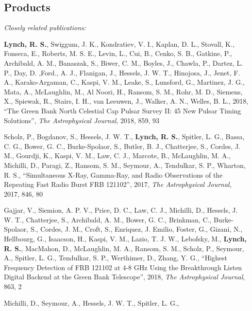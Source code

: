 \documentclass[10pt]{myNSF}
\begin{document}
\subsection*{\normalsize Products}

\textit{Closely related publications:}
\vspace{-1em}
\begin{itemize*}
\item{\textbf{Lynch, R. S.}, Swiggum, J. K., Kondratiev, V. I.,
  Kaplan, D. L., Stovall, K., Fonseca, E., Roberts, M. S. E., Levin,
  L., Cui, B., Cenko, S. B., Gatkine, P., Archibald, A. M., Banaszak,
  S., Biwer, C. M., Boyles, J., Chawla, P., Dartez, L. P., Day,
  D. ,Ford., A. J., Flanigan, J., Hessels, J. W. T., Hinojosa, J.,
  Jenet, F. A., Karako-Argaman, C., Kaspi, V. M., Leake, S., Lunsford,
  G., Martinez, J. G., Mata, A., McLaughlin, M., Al Noori, H., Ransom,
  S. M., Rohr, M. D., Siemens, X., Spiewak, R., Stairs, I. H., van
  Leeuwen, J., Walker, A. N., Welles, B. L., 2018, ``The Green Bank
  North Celestial Cap Pulsar Survey II: 45 New Pulsar Timing
  Solutions'', \emph{The Astrophysical Journal}, 2018, 859, 93}
\item{Scholz, P., Bogdanov, S., Hessels, J. W. T., \textbf{Lynch,
    R. S.}, Spitler, L. G., Bassa, C. G., Bower, G. C., Burke-Spolaor,
  S., Butler, B. J., Chatterjee, S., Cordes, J. M., Gourdji, K.,
  Kaspi, V. M., Law, C. J., Marcote, B., McLaughlin, M. A., Michilli,
  D., Paragi, Z., Ransom, S. M., Seymour, A., Tendulkar, S. P.,
  Wharton, R. S., ``Simultaneous X-Ray, Gamma-Ray, and Radio
  Observations of the Repeating Fast Radio Burst FRB 121102'', 2017,
  \emph{The Astrophysical Journal}, 2017, 846, 80}
\item{Gajjar, V., Siemion, A. P. V., Price, D. C., Law, C. J.,
  Michilli, D., Hessels, J. W. T., Chatterjee, S., Archibald, A. M.,
  Bower, G. C., Brinkman, C., Burke-Spolaor, S., Cordes, J. M., Croft,
  S., Enriquez, J. Emilio, Foster, G., Gizani, N., Hellbourg, G.,
  Isaacson, H., Kaspi, V. M., Lazio, T. J. W., Lebofsky, M.,
  \textbf{Lynch, R. S.}, MacMahon, D., McLaughlin, M. A., Ransom,
  S. M., Scholz, P., Seymour, A., Spitler, L. G., Tendulkar, S. P.,
  Werthimer, D., Zhang, Y. G., ``Highest Frequency Detection of FRB
  121102 at 4-8 GHz Using the Breakthrough Listen Digital Backend at
  the Green Bank Telescope'', 2018, \emph{The Astrophysical Journal},
  863, 2}
\item{Michilli, D., Seymour, A., Hessels, J. W. T., Spitler, L. G.,
}
\end{itemize*}
\end{document}
